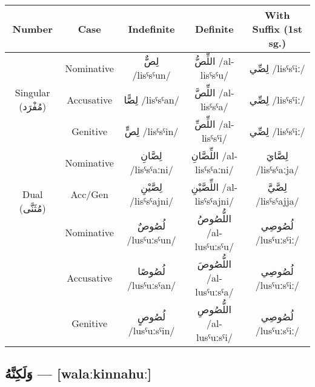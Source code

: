 \documentclass[letterpaper,12pt]{article}
\begin{document}
\begin{tabular}{|c|c|c|c|c|}
\hline
\textbf{Number} & \textbf{Case} & \textbf{Indefinite} & \textbf{Definite} & \textbf{With Suffix (1st sg.)} \\
\hline
\multirow{3}{*}{Singular (\textarabic{مُفْرَد})}
& Nominative & \textarabic{لِصٌّ} /lisˤsˤun/ & \textarabic{اللِّصُّ} /al-lisˤsˤu/ & \textarabic{لِصِّي} /lisˤsˤiː/ \\
& Accusative & \textarabic{لِصًّا} /lisˤsˤan/ & \textarabic{اللِّصَّ} /al-lisˤsˤa/ & \textarabic{لِصِّي} /lisˤsˤiː/ \\
& Genitive & \textarabic{لِصٍّ} /lisˤsˤin/ & \textarabic{اللِّصِّ} /al-lisˤsˤi/ & \textarabic{لِصِّي} /lisˤsˤiː/ \\
\hline
\multirow{3}{*}{Dual (\textarabic{مُثَنَّى})}
& Nominative & \textarabic{لِصَّانِ} /lisˤsˤaːni/ & \textarabic{اللِّصَّانِ} /al-lisˤsˤaːni/ & \textarabic{لِصَّايَ} /lisˤsˤaːja/ \\
& Acc/Gen & \textarabic{لِصَّيْنِ} /lisˤsˤajni/ & \textarabic{اللِّصَّيْنِ} /al-lisˤsˤajni/ & \textarabic{لِصَّيَّ} /lisˤsˤajja/ \\
\hline
\multirow{3}{*}{Plural (\textarabic{جَمْع})}
& Nominative & \textarabic{لُصُوصٌ} /lusˤuːsˤun/ & \textarabic{اللُّصُوصُ} /al-lusˤuːsˤu/ & \textarabic{لُصُوصِي} /lusˤuːsˤiː/ \\
& Accusative & \textarabic{لُصُوصًا} /lusˤuːsˤan/ & \textarabic{اللُّصُوصَ} /al-lusˤuːsˤa/ & \textarabic{لُصُوصِي} /lusˤuːsˤiː/ \\
& Genitive & \textarabic{لُصُوصٍ} /lusˤuːsˤin/ & \textarabic{اللُّصُوصِ} /al-lusˤuːsˤi/ & \textarabic{لُصُوصِي} /lusˤuːsˤiː/ \\
\hline
\end{tabular}

\subsection{\textarabic{وَلَكِنَّهُ} — [walaːkinnahuː]}
\end{document}
